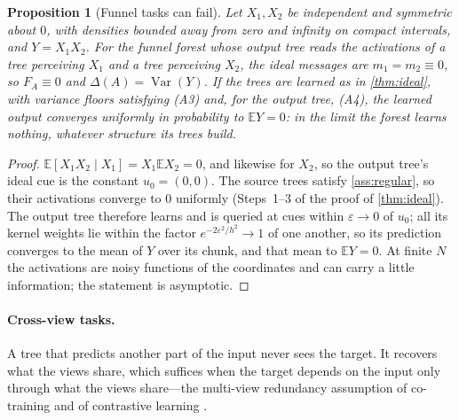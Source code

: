 \documentclass[11pt]{article}
\newtheorem{proposition}[theorem]{Proposition}
\theoremstyle{definition}
\theoremstyle{remark}
\newcommand{\E}{\mathbb{E}}
\newcommand{\Var}{\operatorname{Var}}
\begin{document}
\begin{proposition}[Funnel tasks can fail]\label{prop:xy}
Let $X_1,X_2$ be independent and symmetric about $0$, with densities bounded away from
zero and infinity on compact intervals, and $Y=X_1X_2$.  For the funnel forest whose output tree reads
the activations of a tree perceiving $X_1$ and a tree perceiving $X_2$, the ideal
messages are $m_1=m_2\equiv0$, so $F_A\equiv0$ and $\Delta(A)=\Var(Y)$.  If the trees are
learned as in \cref{thm:ideal}, with variance floors satisfying (A3) and, for the output
tree, (A4),
the learned output converges uniformly in probability to $\E Y=0$: in the limit the
forest learns nothing, whatever structure its trees build.
\end{proposition}
\begin{proof}
$\E[X_1X_2\mid X_1]=X_1\E X_2=0$, and likewise for $X_2$, so the output tree's ideal cue
is the constant $u_0=(0,0)$.  The source trees satisfy \cref{ass:regular}, so their
activations converge to $0$ uniformly (Steps~1--3 of the proof of \cref{thm:ideal}).  The
output tree therefore learns and is queried at cues within $\varepsilon\to0$ of $u_0$;
all its kernel weights lie within the factor $e^{-2\varepsilon^2/h^2}\to1$ of one another,
so its prediction converges to the mean of $Y$ over its chunk, and that mean to $\E Y=0$.
At finite $N$ the activations are noisy functions of the coordinates and can carry a
little information; the statement is asymptotic.
\end{proof}

\paragraph{Cross-view tasks.}
A tree that predicts another part of the input never sees the target.  It recovers what
the views share, which suffices when the target depends on the input only through what
the views share---the multi-view redundancy assumption of co-training and of
contrastive learning \citep{blum1998,tosh2021}.
\end{document}
